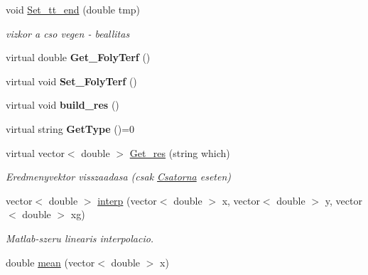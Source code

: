 \begin{DoxyCompactItemize}
\mbox{\label{class_agelem_a9ff9bdd8cfd642c697cde656576315a6}} 
void \hyperlink{class_agelem_a9ff9bdd8cfd642c697cde656576315a6}{Set\+\_\+tt\+\_\+end} (double tmp)
\begin{DoxyCompactList}\small\item\em vizkor a cso vegen -\/ beallitas \end{DoxyCompactList}\item 
\mbox{\label{class_agelem_a0b858ef17c27b14b60c29404be67e486}} 
virtual double {\bfseries Get\+\_\+\+Foly\+Terf} ()
\item 
\mbox{\label{class_agelem_a52bbebe64a09fb4e96e870cd7dfc5fc7}} 
virtual void {\bfseries Set\+\_\+\+Foly\+Terf} ()
\item 
\mbox{\label{class_agelem_ac79eb4da65122b22558f66b8e4e8231b}} 
virtual void {\bfseries build\+\_\+res} ()
\item 
\mbox{\label{class_agelem_a0b648fe896fb1c2abdbb30023ddb3f5d}} 
virtual string {\bfseries Get\+Type} ()=0
\item 
\mbox{\label{class_agelem_ad31d35680f3bb4941f4a68d6f208a2d7}} 
virtual vector$<$ double $>$ \hyperlink{class_agelem_ad31d35680f3bb4941f4a68d6f208a2d7}{Get\+\_\+res} (string which)
\begin{DoxyCompactList}\small\item\em Eredmenyvektor visszaadasa (csak \hyperlink{class_csatorna}{Csatorna} eseten) \end{DoxyCompactList}\item 
\mbox{\label{class_agelem_a2bf7db59960759d324cbef9632ca7df8}} 
vector$<$ double $>$ \hyperlink{class_agelem_a2bf7db59960759d324cbef9632ca7df8}{interp} (vector$<$ double $>$ x, vector$<$ double $>$ y, vector$<$ double $>$ xg)
\begin{DoxyCompactList}\small\item\em Matlab-\/szeru linearis interpolacio. \end{DoxyCompactList}\item 
\mbox{\label{class_agelem_a126c41d23c78c6d5a81feafd6829e236}} 
double \hyperlink{class_agelem_a126c41d23c78c6d5a81feafd6829e236}{mean} (vector$<$ double $>$ x)

\end{DoxyCompactItemize}
